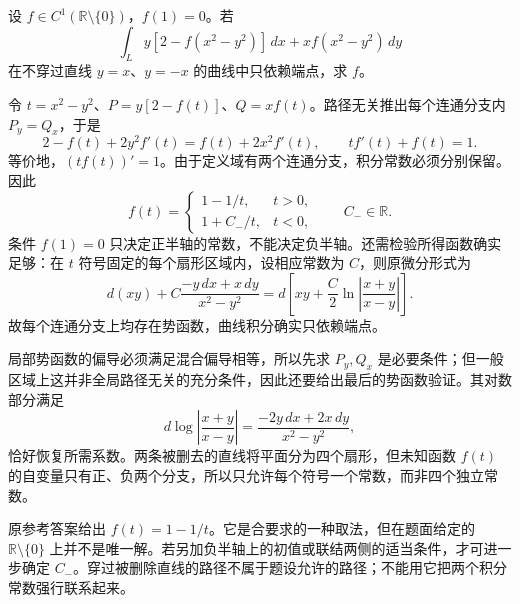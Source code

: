 \documentclass[12pt,fontset=fandol]{ctexart}
\begin{document}
\begin{example}\label{nm-2018-2}
设 $f\in C^1(\mathbb R\setminus\{0\})$，$f(1)=0$。若
\[
 \int_L y[2-f(x^2-y^2)]\,dx+x f(x^2-y^2)\,dy
\]
在不穿过直线 $y=x$、$y=-x$ 的曲线中只依赖端点，求 $f$。
\end{example}
\begin{solve}
令 $t=x^2-y^2$、$P=y[2-f(t)]$、$Q=xf(t)$。路径无关推出每个连通分支内 $P_y=Q_x$，于是
\[
 2-f(t)+2y^2f'(t)=f(t)+2x^2f'(t),\qquad tf'(t)+f(t)=1.
\]
等价地，$(tf(t))'=1$。由于定义域有两个连通分支，积分常数必须分别保留。因此
\[
 f(t)=\begin{cases}1-1/t,&t>0,\\1+C_-/t,&t<0,\end{cases}
 \qquad C_-\in\mathbb R.
\]
条件 $f(1)=0$ 只决定正半轴的常数，不能决定负半轴。还需检验所得函数确实足够：在 $t$ 符号固定的每个扇形区域内，设相应常数为 $C$，则原微分形式为
\[
 d(xy)+C\frac{-y\,dx+x\,dy}{x^2-y^2}
 =d\left[xy+\frac C2\ln\left|\frac{x+y}{x-y}\right|\right].
\]
故每个连通分支上均存在势函数，曲线积分确实只依赖端点。

局部势函数的偏导必须满足混合偏导相等，所以先求 $P_y,Q_x$ 是必要条件；但一般区域上这并非全局路径无关的充分条件，因此还要给出最后的势函数验证。其对数部分满足
\[
d\log\left|\frac{x+y}{x-y}\right|
=\frac{-2y\,dx+2x\,dy}{x^2-y^2},
\]
恰好恢复所需系数。两条被删去的直线将平面分为四个扇形，但未知函数 $f(t)$ 的自变量只有正、负两个分支，所以只允许每个符号一个常数，而非四个独立常数。

\end{solve}
\begin{remark}[对参考答案的条件补充]
原参考答案给出 $f(t)=1-1/t$。它是合要求的一种取法，但在题面给定的 $\mathbb R\setminus\{0\}$ 上并不是唯一解。若另加负半轴上的初值或联结两侧的适当条件，才可进一步确定 $C_-$。穿过被删除直线的路径不属于题设允许的路径；不能用它把两个积分常数强行联系起来。
\end{remark}
\end{document}
